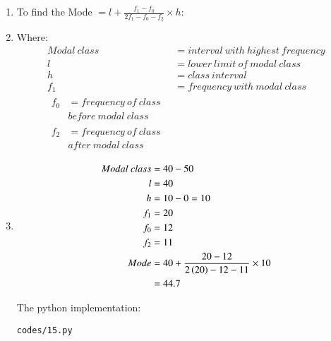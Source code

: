 \renewcommand{\theequation}{\theenumi}
\begin{enumerate}

\item To find the Mode $= l + \frac{f_1 - f_0}{2f_1 - f_0 - f_2} \times h$:

\item Where:
\begin{align*}
Modal\ class &= interval\ with\ highest\ frequency\\
l &= lower\ limit\ of\ modal\ class\\
h &= class\ interval\\
f_1 &= frequency\ with\ modal\ class\\
\begin{split}
f_0 &= frequency\ of\ class\ \\ &before\ modal\ class
\end{split}\\
\begin{split}
f_2 &= frequency\ of\ class\ \\ &after\ modal\ class
\end{split}
\end{align*}

\item
\begin{align}
Modal\ class &= 40 - 50\\ 
l &= 40\\
h &= 10 - 0 = 10\\
f_1 &= 20\\
f_0 &= 12\\
f_2 &= 11\\
Mode &= 40 + \frac{20-12}{2\left(20\right) - 12- 11} \times 10\\
&= 44.7
\end{align}



The python implementation:
\begin{lstlisting}
codes/15.py
\end{lstlisting}

\end{enumerate}

